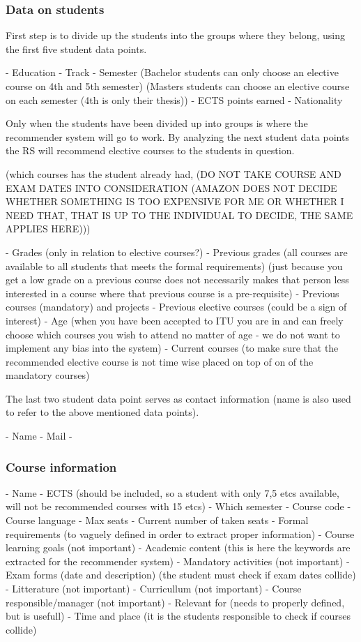 \subsubsection{Data on students}
First step is to divide up the students into the groups where they belong, using the first five student data points.

- Education
- Track
- Semester (Bachelor students can only choose an elective course on 4th and 5th semester) (Masters students can choose an elective course on each semester (4th is only their thesis))
- ECTS points earned
- Nationality

Only when the students have been divided up into groups is where the recommender system will go to work. By analyzing the next student data points the RS will recommend elective courses to the students in question.

(which courses has the student already had, (DO NOT TAKE COURSE AND EXAM DATES INTO CONSIDERATION (AMAZON DOES NOT DECIDE WHETHER SOMETHING IS TOO EXPENSIVE FOR ME OR WHETHER I NEED THAT, THAT IS UP TO THE INDIVIDUAL TO DECIDE, THE SAME APPLIES HERE)))

- Grades (only in relation to elective courses?)
- Previous grades (all courses are available to all students that meets the formal requirements) (just because you get a low grade on a previous course does not necessarily makes that person less interested in a course where that previous course is a pre-requisite)
- Previous courses (mandatory) and projects
- Previous elective courses (could be a sign of interest)
- Age (when you have been accepted to ITU you are in and can freely choose which courses you wish to attend no matter of age - we do not want to implement any bias into the system)
- Current courses (to make sure that the recommended elective course is not time wise placed on top of on of the mandatory courses)

The last two student data point serves as contact information (name is also used to refer to the above mentioned data points).
 
- Name
- Mail
- 

\subsubsection{Course information}

- Name
- ECTS (should be included, so a student with only 7,5 etcs available, will not be recommended courses with 15 etcs)
- Which semester
- Course code
- Course language
- Max seats
- Current number of taken seats
- Formal requirements (to vaguely defined in order to extract proper information)
- Course learning goals (not important)
- Academic content (this is here the keywords are extracted for the recommender system)
- Mandatory activities (not important)
- Exam forms (date and description) (the student must check if exam dates collide)
- Litterature (not important)
- Curricullum (not important)
- Course responsible/manager (not important)
- Relevant for (needs to properly defined, but is usefull)
- Time and place (it is the students responsible to check if courses collide)




